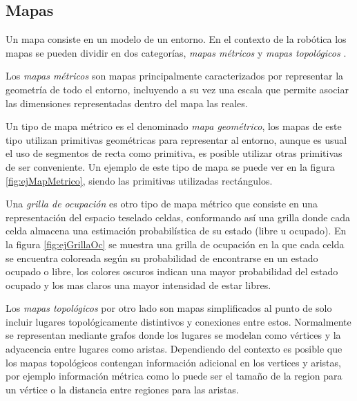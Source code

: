 
\subsection{Mapas}\label{subsec:mapas}
Un mapa consiste en un modelo de un entorno. En el contexto de la robótica los mapas se pueden dividir en dos categorías, \emph{mapas métricos} y \emph{mapas topológicos} \cite{Thrun1998,choset2005principles}.

Los \emph{mapas métricos} son mapas principalmente caracterizados por representar la geometría de todo el entorno, incluyendo a su vez una escala que permite asociar las dimensiones representadas dentro del mapa las reales.

Un tipo de mapa métrico es el denominado \emph{mapa geométrico}, los mapas de este tipo utilizan primitivas geométricas para representar al entorno, aunque es usual el uso de segmentos de recta como primitiva, es posible utilizar otras primitivas de ser conveniente. Un ejemplo de este tipo de mapa se puede ver en la figura \ref{fig:ejMapMetrico}, siendo las primitivas utilizadas rectángulos.

Una \emph{grilla de ocupación} es otro tipo de mapa métrico que consiste en una representación del espacio teselado celdas, conformando así una grilla donde cada celda almacena una estimación probabilística de su estado (libre u ocupado). En la figura \ref{fig:ejGrillaOc} se muestra una grilla de ocupación en la que cada celda se encuentra coloreada según su probabilidad de encontrarse en un estado ocupado o libre, los colores oscuros indican una mayor probabilidad del estado ocupado y los mas claros una mayor intensidad de estar libres.

Los \emph{mapas topológicos} por otro lado son mapas simplificados al punto de solo incluir lugares topológicamente distintivos y conexiones entre estos. Normalmente se representan mediante grafos donde los lugares se modelan como vértices y la adyacencia entre lugares como aristas. Dependiendo del contexto es posible que los mapas topológicos contengan información adicional en los vertices y aristas, por ejemplo información métrica como lo puede ser el tamaño de la region para un vértice o la distancia entre regiones para las aristas.

